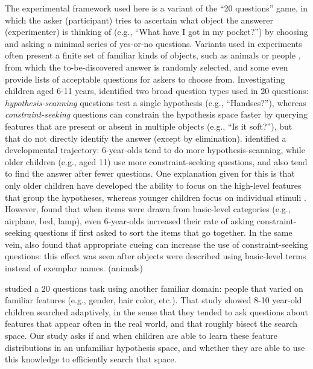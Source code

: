 \documentclass[10pt,letterpaper]{article}
\begin{document}
The experimental framework used here is a variant of the ``20 questions'' game, in which the asker (participant) tries to ascertain what object the answerer (experimenter) is thinking of (e.g., ``What have I got in my pocket?'') by choosing and asking a minimal series of yes-or-no questions. Variants used in experiments often present a finite set of familiar kinds of objects, such as animals \cite{Ruggeri:2015front} or people \cite{Nelson:2014}, from which the to-be-discovered answer is randomly selected, and some even provide lists of acceptable questions for askers to choose from. Investigating children aged 6-11 years,  identified two broad question types used in 20 questions: \emph{hypothesis-scanning} questions test a single hypothesis (e.g., ``Handses?''), whereas \emph{constraint-seeking} questions can constrain the hypothesis space faster by querying features that are present or absent in multiple objects (e.g., ``Is it soft?''), but that do not directly identify the answer (except by elimination).  identified a developmental trajectory: 6-year-olds tend to do more hypothesis-scanning, while older children (e.g., aged 11) use more constraint-seeking questions, and also tend to find the answer after fewer questions. One explanation given for this is that only older children have developed the ability to focus on the high-level features that group the hypotheses, whereas younger children focus on individual stimuli \cite{Mosher:1966,Ruggeri:2015front}. However,  found that when items were drawn from basic-level categories (e.g., airplane, bed, lamp), even 6-year-olds increased their rate of asking constraint-seeking questions if first asked to sort the items that go together. In the same vein,  also found that appropriate cueing can increase the use of constraint-seeking questions: this effect was seen after objects were described using basic-level terms instead of exemplar names. (animals)

 studied a 20 questions task using another familiar domain: people that varied on familiar features (e.g., gender, hair color, etc.). That study showed 8-10 year-old children searched adaptively, in the sense that they tended to ask questions about features that appear often in the real world, and that roughly bisect the search space. Our study asks if and when children are able to learn these feature distributions in an unfamiliar hypothesis space, and whether they are able to use this knowledge to efficiently search that space.
\end{document}
